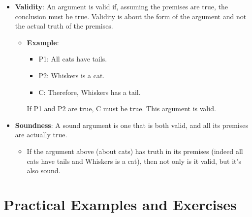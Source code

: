 \documentclass{article}
\begin{document}
\begin{itemize}
    \item \textbf{Validity}: An argument is valid if, assuming the premises are true, the conclusion must be true. Validity is about the form of the argument and not the actual truth of the premises.
          \begin{itemize}
              \item \textbf{Example}:
                    \begin{itemize}
                        \item P1: All cats have tails.
                        \item P2: Whiskers is a cat.
                        \item C: Therefore, Whiskers has a tail.
                    \end{itemize}
                    If P1 and P2 are true, C must be true. This argument is valid.
          \end{itemize}
    \item \textbf{Soundness}: A sound argument is one that is both valid, and all its premises are actually true.
          \begin{itemize}
              \item If the argument above (about cats) has truth in its premises (indeed all cats have tails and Whiskers is a cat), then not only is it valid, but it's also sound.
          \end{itemize}
\end{itemize}

\section{Practical Examples and Exercises}
\end{document}

